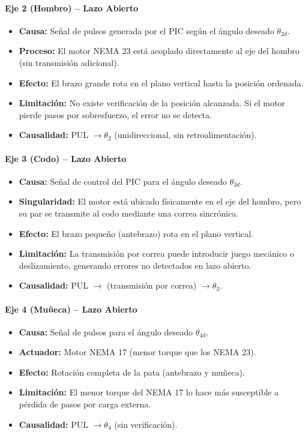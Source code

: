 \documentclass[11pt]{article}
\begin{document}
\paragraph{Eje 2 (Hombro) – Lazo Abierto}
\begin{itemize}
	\item \textbf{Causa:} Señal de pulsos generada por el PIC según el ángulo deseado $\theta_{2d}$.
	\item \textbf{Proceso:} El motor NEMA 23 está acoplado directamente al eje del hombro (sin transmisión adicional).
	\item \textbf{Efecto:} El brazo grande rota en el plano vertical hasta la posición ordenada.
	\item \textbf{Limitación:} No existe verificación de la posición alcanzada. Si el motor pierde pasos por sobresfuerzo, el error no se detecta.
	\item \textbf{Causalidad:} PUL $\rightarrow \theta_2$ (unidireccional, sin retroalimentación).
\end{itemize}

\paragraph{Eje 3 (Codo) – Lazo Abierto}
\begin{itemize}
	\item \textbf{Causa:} Señal de control del PIC para el ángulo deseado $\theta_{3d}$.
	\item \textbf{Singularidad:} El motor está ubicado físicamente en el eje del hombro, pero su par se transmite al codo mediante una correa sincrónica.
	\item \textbf{Efecto:} El brazo pequeño (antebrazo) rota en el plano vertical.
	\item \textbf{Limitación:} La transmisión por correa puede introducir juego mecánico o deslizamiento, generando errores no detectados en lazo abierto.
	\item \textbf{Causalidad:} PUL $\rightarrow$ (transmisión por correa) $\rightarrow \theta_3$.
\end{itemize}

\paragraph{Eje 4 (Muñeca) – Lazo Abierto}
\begin{itemize}
	\item \textbf{Causa:} Señal de pulsos para el ángulo deseado $\theta_{4d}$.
	\item \textbf{Actuador:} Motor NEMA 17 (menor torque que los NEMA 23).
	\item \textbf{Efecto:} Rotación completa de la pata (antebrazo y muñeca).
	\item \textbf{Limitación:} El menor torque del NEMA 17 lo hace más susceptible a pérdida de pasos por carga externa.
	\item \textbf{Causalidad:} PUL $\rightarrow \theta_4$ (sin verificación).
\end{itemize}
\end{document}
